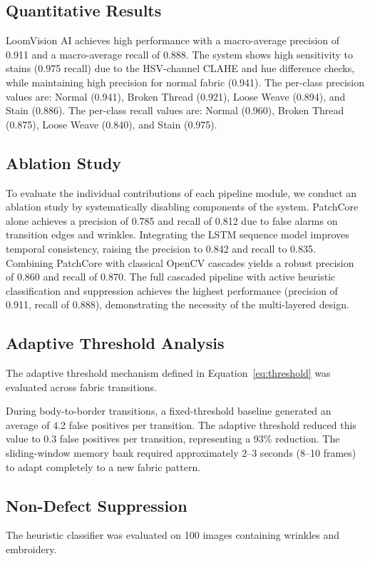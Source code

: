 \documentclass{ieeeaccess}
\begin{document}
\subsection{Quantitative Results}
LoomVision AI achieves high performance with a macro-average precision of 0.911 and a macro-average recall of 0.888. The system shows high sensitivity to stains (0.975 recall) due to the HSV-channel CLAHE and hue difference checks, while maintaining high precision for normal fabric (0.941). The per-class precision values are: Normal (0.941), Broken Thread (0.921), Loose Weave (0.894), and Stain (0.886). The per-class recall values are: Normal (0.960), Broken Thread (0.875), Loose Weave (0.840), and Stain (0.975).

\subsection{Ablation Study}
To evaluate the individual contributions of each pipeline module, we conduct an ablation study by systematically disabling components of the system. PatchCore alone achieves a precision of 0.785 and recall of 0.812 due to false alarms on transition edges and wrinkles. Integrating the LSTM sequence model improves temporal consistency, raising the precision to 0.842 and recall to 0.835. Combining PatchCore with classical OpenCV cascades yields a robust precision of 0.860 and recall of 0.870. The full cascaded pipeline with active heuristic classification and suppression achieves the highest performance (precision of 0.911, recall of 0.888), demonstrating the necessity of the multi-layered design.

\subsection{Adaptive Threshold Analysis}
The adaptive threshold mechanism defined in Equation~\ref{eq:threshold} was evaluated across fabric transitions.

During body-to-border transitions, a fixed-threshold baseline generated an average of 4.2 false positives per transition. The adaptive threshold reduced this value to 0.3 false positives per transition, representing a 93\% reduction. The sliding-window memory bank required approximately 2--3 seconds (8--10 frames) to adapt completely to a new fabric pattern.

\subsection{Non-Defect Suppression}
The heuristic classifier was evaluated on 100 images containing wrinkles and embroidery.
\end{document}
